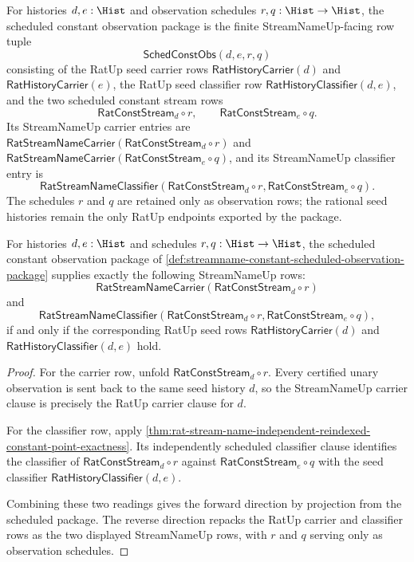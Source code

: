 \begin{definition}
\label{def:streamname-constant-scheduled-observation-package}
For histories $d,e:\Hist$ and observation schedules $r,q:\Hist\to\Hist$, the
scheduled constant observation package is the finite StreamNameUp-facing row
tuple
$$
\mathsf{SchedConstObs}(d,e,r,q)
$$
consisting of the RatUp seed carrier rows
$\mathsf{RatHistoryCarrier}(d)$ and $\mathsf{RatHistoryCarrier}(e)$, the RatUp
seed classifier row $\mathsf{RatHistoryClassifier}(d,e)$, and the two
scheduled constant stream rows
$$
\mathsf{RatConstStream}_d\circ r,
\qquad
\mathsf{RatConstStream}_e\circ q.
$$
Its StreamNameUp carrier entries are
$\mathsf{RatStreamNameCarrier}(\mathsf{RatConstStream}_d\circ r)$ and
$\mathsf{RatStreamNameCarrier}(\mathsf{RatConstStream}_e\circ q)$, and its
StreamNameUp classifier entry is
$$
\mathsf{RatStreamNameClassifier}(\mathsf{RatConstStream}_d\circ r,
\mathsf{RatConstStream}_e\circ q).
$$
The schedules $r$ and $q$ are retained only as observation rows; the rational
seed histories remain the only RatUp endpoints exported by the package.
\end{definition}

\begin{theorem}
\label{thm:streamname-constant-scheduled-observation-exactness}
For histories $d,e:\Hist$ and schedules $r,q:\Hist\to\Hist$, the scheduled
constant observation package of
\autoref{def:streamname-constant-scheduled-observation-package} supplies
exactly the following StreamNameUp rows:
$$
\mathsf{RatStreamNameCarrier}(\mathsf{RatConstStream}_d\circ r)
$$
and
$$
\mathsf{RatStreamNameClassifier}(\mathsf{RatConstStream}_d\circ r,
\mathsf{RatConstStream}_e\circ q),
$$
if and only if the corresponding RatUp seed rows
$\mathsf{RatHistoryCarrier}(d)$ and $\mathsf{RatHistoryClassifier}(d,e)$ hold.
\end{theorem}
\begin{proof}
For the carrier row, unfold $\mathsf{RatConstStream}_d\circ r$. Every certified
unary observation is sent back to the same seed history $d$, so the
StreamNameUp carrier clause is precisely the RatUp carrier clause for $d$.

For the classifier row, apply
\autoref{thm:rat-stream-name-independent-reindexed-constant-point-exactness}.
Its independently scheduled classifier clause identifies the classifier of
$\mathsf{RatConstStream}_d\circ r$ against
$\mathsf{RatConstStream}_e\circ q$ with the seed classifier
$\mathsf{RatHistoryClassifier}(d,e)$.

Combining these two readings gives the forward direction by projection from
the scheduled package. The reverse direction repacks the RatUp carrier and
classifier rows as the two displayed StreamNameUp rows, with $r$ and $q$
serving only as observation schedules.
\end{proof}

